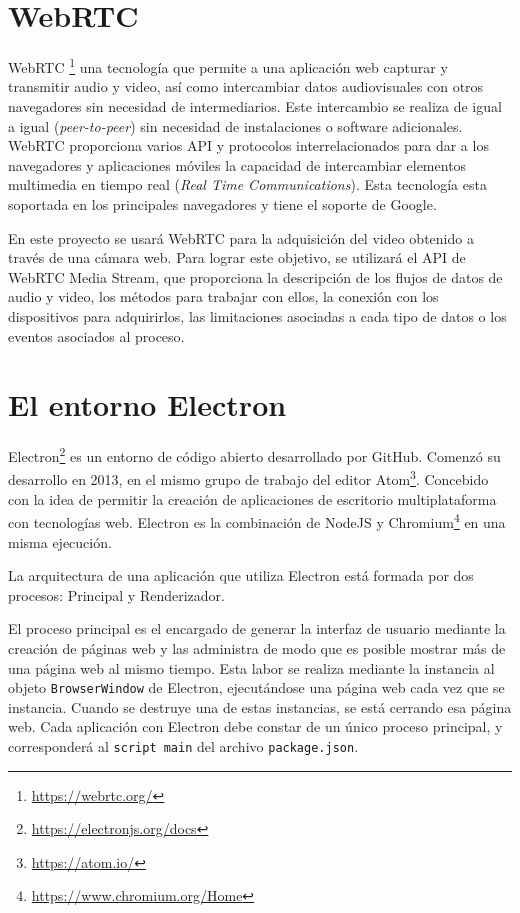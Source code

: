 \section{WebRTC}
WebRTC \footnote{\url{https://webrtc.org/}}  una tecnología que permite a una aplicación web capturar y transmitir audio y video, así como intercambiar datos audiovisuales con otros navegadores sin necesidad de intermediarios. Este intercambio se realiza de igual a igual (\textit{peer-to-peer}) sin necesidad de instalaciones o software adicionales. WebRTC proporciona varios API y protocolos interrelacionados para dar a los navegadores y aplicaciones móviles la capacidad de intercambiar elementos multimedia en tiempo real (\textit{Real Time Communications}). Esta tecnología esta soportada en los principales navegadores y tiene el soporte de Google.

En este proyecto se usará WebRTC para la adquisición del video obtenido a través de una cámara web. Para lograr este objetivo, se utilizará el API de WebRTC Media Stream, que proporciona la descripción de los flujos de datos de audio y video, los métodos para trabajar con ellos, la conexión con los dispositivos para adquirirlos, las limitaciones asociadas a cada tipo de datos o los eventos asociados al proceso.

\section{El entorno Electron}
Electron\footnote{\url{https://electronjs.org/docs}} es un entorno de código abierto desarrollado por GitHub. Comenzó su desarrollo en 2013, en el mismo grupo de trabajo del editor Atom\footnote{\url{https://atom.io/}}. Concebido con la idea de permitir la creación de aplicaciones de escritorio multiplataforma con tecnologías web. Electron es la combinación de NodeJS y Chromium\footnote{\url{https://www.chromium.org/Home}} en una misma ejecución.

La arquitectura de una aplicación que utiliza Electron está formada por dos procesos: Principal y Renderizador. 

El proceso principal es el encargado de generar la interfaz de usuario mediante la creación de páginas web y las administra de modo que es posible mostrar más de una página web al mismo tiempo. Esta labor se realiza mediante la instancia al objeto \texttt{BrowserWindow} de Electron, ejecutándose una página web cada vez que se instancia. Cuando se destruye una de estas instancias, se está cerrando esa página web. Cada aplicación con Electron debe constar de un único proceso principal, y corresponderá al \texttt{script main} del archivo \texttt{package.json}.

